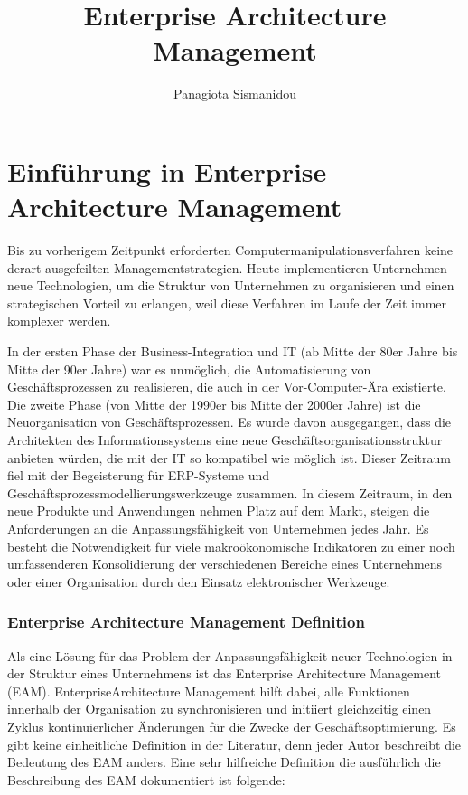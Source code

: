 \documentclass[doc]{apa6}
\title{Enterprise Architecture Management}
\author{Panagiota Sismanidou}
\begin{document}
\maketitle
\tableofcontents

\newpage

\section{Einführung in Enterprise Architecture Management}

Bis zu vorherigem Zeitpunkt erforderten Computermanipulationsverfahren keine derart ausgefeilten Managementstrategien. Heute implementieren Unternehmen neue Technologien, um die Struktur von Unternehmen zu organisieren und einen strategischen Vorteil zu erlangen, weil diese Verfahren im Laufe der Zeit immer komplexer werden.

In der ersten Phase der Business-Integration und IT (ab Mitte der 80er Jahre bis Mitte der 90er Jahre) war es unmöglich, die Automatisierung von Geschäftsprozessen zu realisieren, die auch in der Vor-Computer-Ära existierte. Die zweite Phase (von Mitte der 1990er bis Mitte der 2000er Jahre) ist die Neuorganisation von Geschäftsprozessen. Es wurde davon ausgegangen, dass die Architekten des Informationssystems eine neue Geschäftsorganisationsstruktur anbieten würden, die mit der IT so kompatibel wie möglich ist. Dieser Zeitraum fiel mit der Begeisterung für ERP-Systeme und Geschäftsprozessmodellierungswerkzeuge zusammen. In diesem Zeitraum, in den neue Produkte und Anwendungen  nehmen Platz auf dem Markt, steigen die Anforderungen an die Anpassungsfähigkeit von Unternehmen jedes Jahr. Es besteht die Notwendigkeit für viele makroökonomische Indikatoren zu einer noch umfassenderen Konsolidierung der verschiedenen  Bereiche eines Unternehmens oder einer Organisation durch den Einsatz elektronischer Werkzeuge.

\subsubsection{Enterprise Architecture Management Definition}
Als eine Lösung für das Problem der Anpassungsfähigkeit neuer Technologien in der Struktur eines Unternehmens ist das Enterprise Architecture Management (EAM). EnterpriseArchitecture Management hilft dabei, alle Funktionen innerhalb der Organisation zu synchronisieren und initiiert gleichzeitig einen Zyklus kontinuierlicher Änderungen für die Zwecke der Geschäftsoptimierung. Es gibt keine einheitliche Definition in der Literatur, denn jeder Autor beschreibt die Bedeutung des EAM anders. Eine sehr hilfreiche Definition die ausführlich die Beschreibung des EAM dokumentiert ist folgende:
\end{document}
